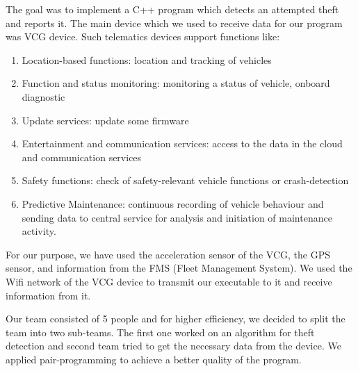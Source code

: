 The goal was to implement a C++ program which detects an attempted theft and reports it. The main device which we used to receive data for our program was VCG device. Such telematics devices support functions like: 
\begin{enumerate}
	\item Location-based functions: location and tracking of vehicles 
	\item Function and status monitoring:  monitoring a status of vehicle, onboard diagnostic
	\item Update services: update some firmware
	\item Entertainment and communication services: access to the data in the cloud and communication services
	\item Safety functions: check of safety-relevant vehicle functions or crash-detection
	\item Predictive Maintenance: continuous recording of vehicle behaviour and sending data to central service for analysis and initiation of maintenance activity.
\end{enumerate}
For our purpose, we have used the acceleration sensor of the VCG, the GPS sensor, and information from the FMS (Fleet Management System). We used the Wifi network of the VCG device to transmit our executable to it and receive information from it.

Our team consisted of 5 people and for higher efficiency, we decided to split the team into two sub-teams. The first one worked on an algorithm for theft detection and second team tried to get the necessary data from the device. We applied pair-programming to achieve a better quality of the program.